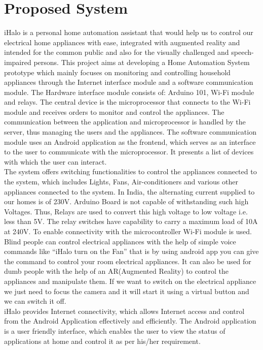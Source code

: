 \section{Proposed System}
\thispagestyle{fancy}
iHalo is a personal home automation assistant that would help us to control our electrical home appliances with ease, integrated with augmented reality and intended for the common public and also for the visually challenged and speech-impaired persons. This project aims at developing a Home Automation System prototype which mainly focuses on monitoring and controlling household appliances through the Internet interface module and a software communication module. The Hardware interface module consists of: Arduino 101, Wi-Fi module and relays. The central device is the microprocessor that connects to the Wi-Fi module and receives orders to monitor and control the appliances. The communication between the application and microprocessor is handled by the server, thus managing the users and the appliances. The software communication module uses an Android application as the frontend, which serves as an interface to the user to communicate with the microprocessor. It presents a list of devices with which the user can interact.\\
The system offers switching functionalities to control the appliances connected to the system, which includes Lights, Fans, Air-conditioners and various other appliances connected to the system. In India, the alternating current supplied to our homes is of 230V. Arduino Board is not capable of withstanding such high Voltages. Thus, Relays are used to convert this high voltage to low voltage i.e. less than 5V. The relay switches have capability to carry a maximum load of 10A at 240V. To enable connectivity with the microcontroller Wi-Fi module is used.\\
Blind people can control electrical appliances with the help of simple voice commands like “iHalo turn on the Fan” that is by using android app you can give the command to control your room electrical appliances. It can also be used for dumb people with the help of an AR(Augmented Reality) to control the appliances and manipulate them. If we want to switch on the electrical appliance we just need to focus the camera and it will start it using a virtual button and we can switch it off.\\
iHalo provides Internet connectivity, which allows Internet access and control from the Android Application effectively and efficiently. The Android application is a user friendly interface, which enables the user to view the status of applications at home and control it as per his/her requirement.
